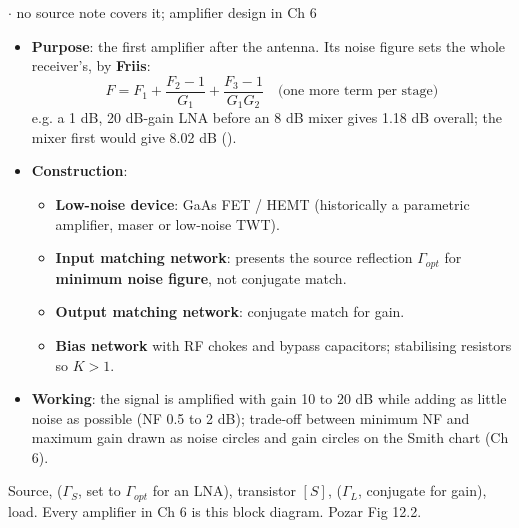 \vspace{2pt}


{\color{sub}\footnotesize {}  \gap$\cdot$\gap \added{} no source note covers it; amplifier design in Ch 6}

\begin{itemize}
  \item \textbf{Purpose}: the first amplifier after the antenna. Its noise figure sets the
    whole receiver's, by \textbf{Friis}:
    \[ F = F_1 + \frac{F_2 - 1}{G_1} + \frac{F_3 - 1}{G_1G_2} \quad\text{(one more term per stage)} \]
    e.g. a 1 dB, 20 dB-gain LNA before an 8 dB mixer gives 1.18 dB overall; the mixer
    first would give 8.02 dB ().
  \item \textbf{Construction}:
  \begin{itemize}
    \item \textbf{Low-noise device}: GaAs FET / HEMT (historically a parametric amplifier,
      maser or low-noise TWT).
    \item \textbf{Input matching network}: presents the source reflection
      $\Gamma_{opt}$ for \textbf{minimum noise figure}, not conjugate match.
    \item \textbf{Output matching network}: conjugate match for gain.
    \item \textbf{Bias network} with RF chokes and bypass capacitors; stabilising
      resistors so $K > 1$.
  \end{itemize}
  \item \textbf{Working}: the signal is amplified with gain 10 to 20 dB while adding as
    little noise as possible (NF 0.5 to 2 dB); trade-off between minimum NF and maximum
    gain drawn as noise circles and gain circles on the Smith chart (Ch 6).
\end{itemize}
\vspace{3pt}
{\color{sub}\footnotesize Source,  ($\Gamma_S$, set to $\Gamma_{opt}$
for an LNA), transistor $[S]$,  ($\Gamma_L$, conjugate for gain),
load. Every amplifier in Ch 6 is this block diagram. Pozar Fig 12.2.}

\vspace{2pt}

